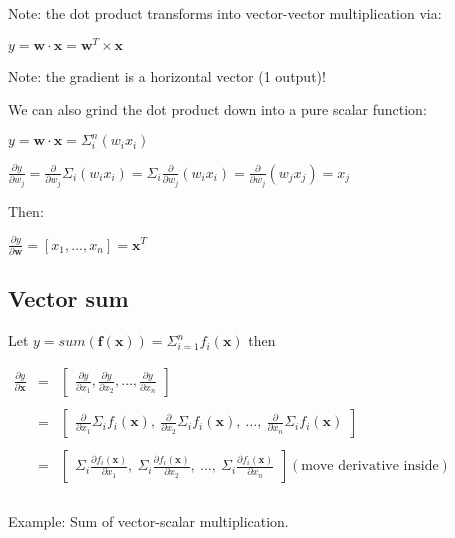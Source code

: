 \documentclass[11pt]{article}
\begin{document}
Note: the dot product transforms into vector-vector multiplication via:

$y = \mathbf{w} \cdot \mathbf{x} = \mathbf{w}^{T} \times \mathbf{x}$

Note: the gradient is a horizontal vector (1 output)!

We can also grind the dot product down into a pure scalar function:

$y = \mathbf{w} \cdot \mathbf{x} = \Sigma_i^n (w_i x_i)$

$\frac{\partial y}{\partial w_j} = \frac{\partial}{\partial w_j} \Sigma_i (w_i x_i) = \Sigma_i \frac{\partial}{\partial w_j} (w_i x_i) = \frac{\partial}{\partial w_j} (w_j x_j) = x_j$

Then:

$\frac{\partial y}{\partial \mathbf{w}} = [ x_1, \ldots, x_n ] = \mathbf{x}^T$

\subsection{Vector sum}

Let $y = sum( \mathbf{f}(\mathbf{x})) = \Sigma_{i=1}^n f_i(\mathbf{x})$ then

$
\begin{array}{lcl}
\frac{\partial y}{\partial \mathbf{x}} & = & \begin{bmatrix} \frac{\partial y}{\partial x_1}, \frac{\partial y}{\partial x_2}, \ldots, \frac{\partial y}{\partial x_n} \end{bmatrix}\\\\
 & = & \begin{bmatrix} \frac{\partial}{\partial x_1} \Sigma_i f_i(\mathbf{x}),~ \frac{\partial}{\partial x_2} \Sigma_i f_i(\mathbf{x}),~ \ldots,~ \frac{\partial}{\partial x_n} \Sigma_i  f_i(\mathbf{x}) \end{bmatrix} \\\\
 & = & \begin{bmatrix} \Sigma_i \frac{\partial f_i(\mathbf{x})}{\partial x_1},~ \Sigma_i \frac{\partial f_i(\mathbf{x})}{\partial x_2},~ \ldots,~ \Sigma_i \frac{\partial f_i(\mathbf{x})}{\partial x_n}  \end{bmatrix}(\text{move derivative inside})\\\\
\end{array}
$

Example: Sum of vector-scalar multiplication.
\end{document}
